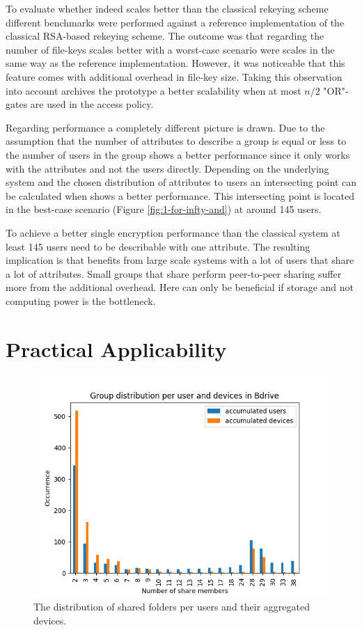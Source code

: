 To evaluate whether \name indeed scales better than the classical rekeying scheme different benchmarks were performed against a reference implementation of the classical RSA-based rekeying scheme. The outcome was that regarding the number of file-keys \name scales better with a worst-case scenario were \name scales in the same way as the reference implementation. However, it was noticeable that this feature comes with additional overhead in file-key size. Taking this observation into account archives the prototype a better scalability when at most $n/2$ "OR"-gates are used in the access policy. 

Regarding performance a completely different picture is drawn. Due to the assumption that the number of attributes to describe a group is equal or less to the number of users in the group \name shows a better performance since it only works with the attributes and not the users directly. Depending on the underlying system and the chosen distribution of attributes to users an intersecting point can be calculated when \name shows a better performance. This intersecting point is located in the best-case scenario (Figure \ref{fig:1-for-infty-and}) at around 145 users. 

To achieve a better single encryption performance than the classical system at least 145 users need to be describable with one attribute. The resulting implication is that \name benefits from large scale systems with a lot of users that share a lot of attributes. Small groups that share perform peer-to-peer sharing suffer more from the additional overhead. Here \name can only be beneficial if storage and not computing power is the bottleneck. 

\section{Practical Applicability}

\begin{figure}[!ht]
\centering
    \includegraphics[width=1.0\linewidth]{img/share_distribution_bdirve.png}
    \caption{The distribution of shared folders per users and their aggregated devices.}
    \label{fig:evaluation-share-distribution}
\end{figure}

